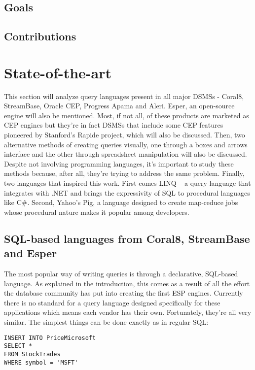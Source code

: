 \documentclass{report}
\begin{document}
\section{Goals}

\section{Contributions}

\chapter{State-of-the-art}
\label{state-of-the-art}

This section will analyze query languages present in all major DSMSs - Coral8, StreamBase, Oracle CEP, Progress Apama and Aleri. Esper, an open-source engine will also be mentioned. Most, if not all, of these products are marketed as CEP engines but they're in fact DSMSs that include some CEP features pioneered by Stanford's Rapide project, which will also be discussed. Then, two alternative methods of creating queries visually, one through a boxes and arrows interface and the other through spreadsheet manipulation will also be discussed. Despite not involving programming languages, it's important to study these methods because, after all, they're trying to address the same problem. Finally, two languages that inspired this work. First comes LINQ -- a query language that integrates with .NET and brings the expressivity of SQL to procedural languages like C\#. Second, Yahoo's Pig, a language designed to create map-reduce jobs whose procedural nature makes it popular among developers.

\section{SQL-based languages from Coral8, StreamBase and Esper}

The most popular way of writing queries is through a declarative, SQL-based language. As explained in the introduction, this comes as a result of all the effort the database community has put into creating the first ESP engines. Currently there is no standard for a query language designed specifically for these applications which means each vendor has their own. Fortunately, they're all very similar. The simplest things can be done exactly as in regular SQL:

\begin{verbatim}
INSERT INTO PriceMicrosoft
SELECT *
FROM StockTrades
WHERE symbol = 'MSFT'
\end{verbatim}
\end{document}
